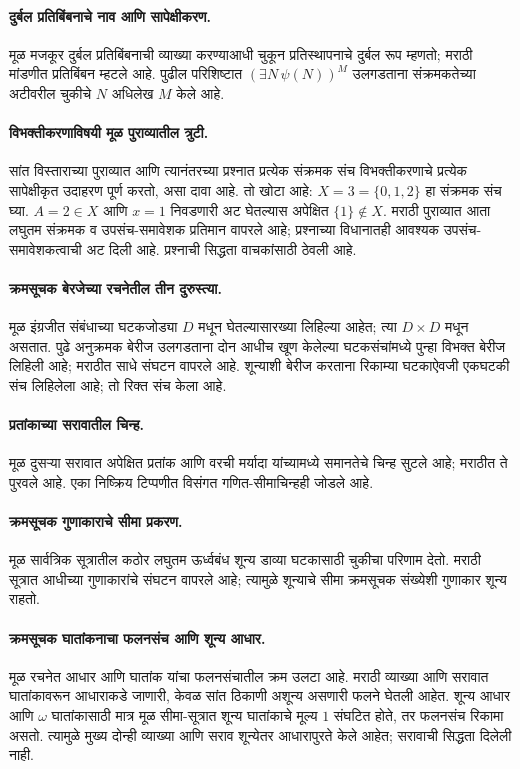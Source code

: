 \paragraph{दुर्बल प्रतिबिंबनाचे नाव आणि सापेक्षीकरण.} मूळ मजकूर दुर्बल प्रतिबिंबनाची व्याख्या करण्याआधी चुकून प्रतिस्थापनाचे दुर्बल रूप म्हणतो; मराठी मांडणीत प्रतिबिंबन म्हटले आहे. पुढील परिशिष्टात $(\exists N\,\psi(N))^M$ उलगडताना संक्रमकतेच्या अटीवरील चुकीचे $N$ अधिलेख $M$ केले आहे.
\paragraph{विभक्तीकरणाविषयी मूळ पुराव्यातील त्रुटी.} सांत विस्ताराच्या पुराव्यात आणि त्यानंतरच्या प्रश्नात प्रत्येक संक्रमक संच विभक्तीकरणाचे प्रत्येक सापेक्षीकृत उदाहरण पूर्ण करतो, असा दावा आहे. तो खोटा आहे: $X=3=\{0,1,2\}$ हा संक्रमक संच घ्या. $A=2\in X$ आणि $x=1$ निवडणारी अट घेतल्यास अपेक्षित $\{1\}\notin X$. मराठी पुराव्यात आता लघुतम संक्रमक व उपसंच-समावेशक प्रतिमान वापरले आहे; प्रश्नाच्या विधानातही आवश्यक उपसंच-समावेशकत्वाची अट दिली आहे. प्रश्नाची सिद्धता वाचकांसाठी ठेवली आहे.

\paragraph{क्रमसूचक बेरजेच्या रचनेतील तीन दुरुस्त्या.} मूळ इंग्रजीत संबंधाच्या घटकजोड्या $D$ मधून घेतल्यासारख्या लिहिल्या आहेत; त्या $D\times D$ मधून असतात. पुढे अनुक्रमक बेरीज उलगडताना दोन आधीच खूण केलेल्या घटकसंचांमध्ये पुन्हा विभक्त बेरीज लिहिली आहे; मराठीत साधे संघटन वापरले आहे. शून्याशी बेरीज करताना रिकाम्या घटकाऐवजी एकघटकी संच लिहिलेला आहे; तो रिक्त संच केला आहे.
\paragraph{प्रतांकाच्या सरावातील चिन्ह.} मूळ दुसऱ्या सरावात अपेक्षित प्रतांक आणि वरची मर्यादा यांच्यामध्ये समानतेचे चिन्ह सुटले आहे; मराठीत ते पुरवले आहे. एका निष्क्रिय टिप्पणीत विसंगत गणित-सीमाचिन्हही जोडले आहे.
\paragraph{क्रमसूचक गुणाकाराचे सीमा प्रकरण.} मूळ सार्वत्रिक सूत्रातील कठोर लघुतम ऊर्ध्वबंध शून्य डाव्या घटकासाठी चुकीचा परिणाम देतो. मराठी सूत्रात आधीच्या गुणाकारांचे संघटन वापरले आहे; त्यामुळे शून्याचे सीमा क्रमसूचक संख्येशी गुणाकार शून्य राहतो.
\paragraph{क्रमसूचक घातांकनाचा फलनसंच आणि शून्य आधार.} मूळ रचनेत आधार आणि घातांक यांचा फलनसंचातील क्रम उलटा आहे. मराठी व्याख्या आणि सरावात घातांकावरून आधाराकडे जाणारी, केवळ सांत ठिकाणी अशून्य असणारी फलने घेतली आहेत. शून्य आधार आणि $\omega$ घातांकासाठी मात्र मूळ सीमा-सूत्रात शून्य घातांकाचे मूल्य $1$ संघटित होते, तर फलनसंच रिकामा असतो. त्यामुळे मुख्य दोन्ही व्याख्या आणि सराव शून्येतर आधारापुरते केले आहेत; सरावाची सिद्धता दिलेली नाही.

